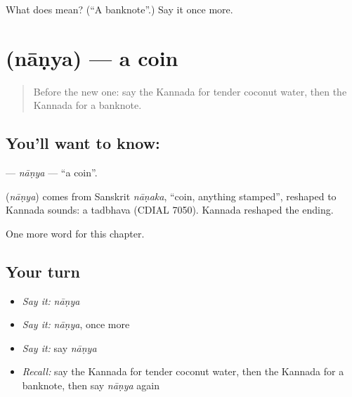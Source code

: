 \begin{tcolorbox}[breakable,colback=teal!4,colframe=teal!35!black,title={Before you move on}]
What does  mean? (\textquotedblleft{}A banknote\textquotedblright{}.) Say it once more.
\end{tcolorbox}
\section[\texorpdfstring{\kn{ನಾಣ್ಯ} (nāṇya)}{ನಾಣ್ಯ (nāṇya)}]{ (nāṇya) — a coin}

\label{lesson:KA-C185-nanya}



\begin{quote}
Before the new one: say the Kannada for tender coconut water, then the Kannada for a banknote.
\end{quote}

\subsection*{You'll want to know: }
\textbf{} — \emph{nāṇya} — \textquotedblleft{}a coin\textquotedblright{}.

\begin{cousinweb}
\textbf{} (\emph{nāṇya}) comes from Sanskrit \emph{nāṇaka}, \textquotedblleft{}coin, anything stamped\textquotedblright{}, reshaped to Kannada sounds: a tadbhava (CDIAL 7050). Kannada reshaped the ending.
\end{cousinweb}

\begin{grammarlens}[title={What you've built}]
One more word for this chapter.
\end{grammarlens}

\subsection*{Your turn}
\begin{itemize}
\raggedright
  \item \emph{Say it:} \emph{nāṇya}
  \item \emph{Say it:} \emph{nāṇya}, once more
  \item \emph{Say it:} say \emph{nāṇya}
  \item \emph{Recall:} say the Kannada for tender coconut water, then the Kannada for a banknote, then say \emph{nāṇya} again
\end{itemize}

